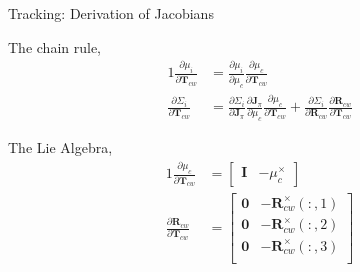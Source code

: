 \begin{Frame}{Tracking: Derivation of Jacobians }
	\par The chain rule,
	\begin{alignat}{1}
		\frac{\partial \mu_i}{\partial \mathbf{T}_{cw}}    & = \frac{\partial \mu_i}{\partial \mu_c} \frac{\partial \mu_c}{\partial \mathbf{T}_{cw}}                                                                                                                                                                               \\
		\frac{\partial \Sigma_i}{\partial \mathbf{T}_{cw}} & = \frac{\partial \Sigma_i}{\partial \mathbf{J}_{\pi}} \frac{\partial \mathbf{J}_{\pi}}{\partial \mu_c} \frac{\partial \mu_c}{\partial \mathbf{T}_{cw}} + \frac{\partial \Sigma_i}{\partial \mathbf{R}_{cw}} \frac{\partial \mathbf{R}_{cw}}{\partial \mathbf{T}_{cw}}
	\end{alignat}
	\pause
	\par The Lie Algebra,
	\begin{alignat}{1}
		\frac{\partial \mu_c}{\partial \mathbf{T}_{cw}}           & = \begin{bmatrix}
			                                                              \mathbf{I} & -\mu_{c}^{\times}
		                                                              \end{bmatrix}               \\
		\frac{\partial \mathbf{R}_{cw}}{\partial \mathbf{T}_{cw}} & = \begin{bmatrix}
			                                                              \mathbf{0} & - \mathbf{R}_{cw}^{\times}(:,1) \\
			                                                              \mathbf{0} & - \mathbf{R}_{cw}^{\times}(:,2) \\
			                                                              \mathbf{0} & - \mathbf{R}_{cw}^{\times}(:,3) \\
		                                                              \end{bmatrix}
	\end{alignat}
\end{Frame}

